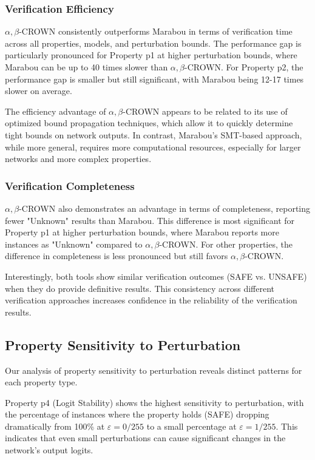\subsubsection{Verification Efficiency}

$\alpha, \beta$-CROWN consistently outperforms Marabou in terms of verification time across all properties, models, and perturbation bounds. The performance gap is particularly pronounced for Property p1 at higher perturbation bounds, where Marabou can be up to 40 times slower than $\alpha, \beta$-CROWN. For Property p2, the performance gap is smaller but still significant, with Marabou being 12-17 times slower on average.

The efficiency advantage of $\alpha, \beta$-CROWN appears to be related to its use of optimized bound propagation techniques, which allow it to quickly determine tight bounds on network outputs. In contrast, Marabou's SMT-based approach, while more general, requires more computational resources, especially for larger networks and more complex properties.

\subsubsection{Verification Completeness}

$\alpha, \beta$-CROWN also demonstrates an advantage in terms of completeness, reporting fewer "Unknown" results than Marabou. This difference is most significant for Property p1 at higher perturbation bounds, where Marabou reports more instances as "Unknown" compared to $\alpha, \beta$-CROWN. For other properties, the difference in completeness is less pronounced but still favors $\alpha, \beta$-CROWN.

Interestingly, both tools show similar verification outcomes (SAFE vs. UNSAFE) when they do provide definitive results. This consistency across different verification approaches increases confidence in the reliability of the verification results.

\subsection{Property Sensitivity to Perturbation}

Our analysis of property sensitivity to perturbation reveals distinct patterns for each property type.

Property p4 (Logit Stability) shows the highest sensitivity to perturbation, with the percentage of instances where the property holds (SAFE) dropping dramatically from 100\% at $\varepsilon = 0/255$ to a small percentage at $\varepsilon = 1/255$. This indicates that even small perturbations can cause significant changes in the network's output logits.

